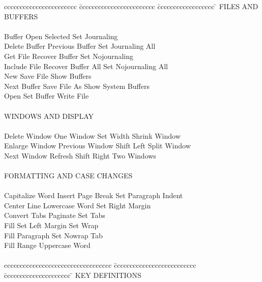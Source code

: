\begin{tabbing}
ccccccccccccccccccccccc \= cccccccccccccccccccccccc \= cccccccccccccccccc \= \kill
 FILES AND BUFFERS \\
 \\
    Buffer         \>  Open Selected      \>  Set Journaling           \\
    Delete Buffer  \>  Previous Buffer    \>  Set Journaling All       \\
    Get File       \>  Recover Buffer     \>  Set Nojournaling         \\
    Include File   \>  Recover Buffer All \>  Set Nojournaling All     \\
    New            \>  Save File          \>  Show Buffers             \\
    Next Buffer    \>  Save File As       \>  Show System Buffers      \\
    Open           \>  Set Buffer         \>  Write File               \\
 \\
 WINDOWS AND DISPLAY\\
 \\
    Delete Window  \>  One Window      \>  Set Width   \>   Shrink Window  \\
    Enlarge Window \>  Previous Window \>  Shift Left  \>   Split Window   \\
    Next Window    \>  Refresh         \>  Shift Right \>   Two Windows    \\
 \\
 FORMATTING AND CASE CHANGES \\
 \\
    Capitalize Word  \>   Insert Page Break \>   Set Paragraph Indent      \\
    Center Line      \>   Lowercase Word    \>   Set Right Margin          \\
    Convert Tabs     \>   Paginate          \>   Set Tabs                  \\
    Fill             \>   Set Left Margin   \>   Set Wrap                  \\
    Fill Paragraph   \>   Set Nowrap        \>   Tab                       \\
    Fill Range       \>                     \>   Uppercase Word            \\
 \\
cccccccccccccccccccccccccccccccccc \= cccccccccccccccccccccccccc \= ccccccccccccccccccccc \= \kill
 KEY DEFINITIONS \\

\end{tabbing}

